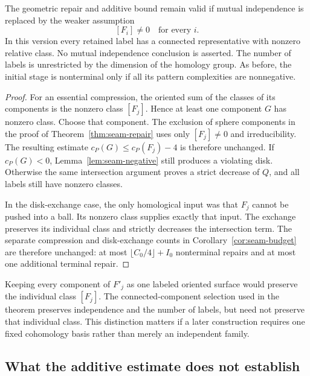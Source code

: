 \begin{corollary}
\label{cor:seam-nonzero}
The geometric repair and additive bound remain valid if mutual
independence is replaced by the weaker assumption
\[
               [F_i]\ne0\quad\text{for every }i.
\]
In this version every retained label has a connected representative with
nonzero relative class.  No mutual independence conclusion is asserted.
The number of labels is unrestricted by the dimension of the homology
group.  As before, the initial stage is nonterminal only if all its
pattern complexities are nonnegative.
\end{corollary}

\begin{proof}
For an essential compression, the oriented sum of the classes of its
components is the nonzero class $[F_j]$.  Hence at least one component
$G$ has nonzero class.  Choose that component.  The exclusion of sphere
components in the proof of Theorem~\ref{thm:seam-repair} uses only
$[F_j]\ne0$ and irreducibility.  The resulting estimate
$c_P(G)\leq c_P(F_j)-4$ is therefore unchanged.  If $c_P(G)<0$,
Lemma~\ref{lem:seam-negative} still produces a violating disk.
Otherwise the same intersection argument proves a strict decrease of
$Q$, and all labels still have nonzero classes.

In the disk-exchange case, the only homological input was that $F_j$
cannot be pushed into a ball.  Its nonzero class supplies exactly that
input.  The exchange preserves its individual class and strictly
decreases the intersection term.  The separate compression and
disk-exchange counts in Corollary~\ref{cor:seam-budget} are therefore
unchanged: at most $\lfloor C_0/4\rfloor+I_0$ nonterminal repairs
and at most one additional terminal repair.
\end{proof}

Keeping every component of $F'_j$ as one labeled oriented surface would
preserve the individual class $[F_j]$.  The connected-component selection
used in the theorem preserves independence and the number of labels, but
need not preserve that individual class.  This distinction matters if a
later construction requires one fixed cohomology basis rather than merely
an independent family.

\subsection{What the additive estimate does not establish}

